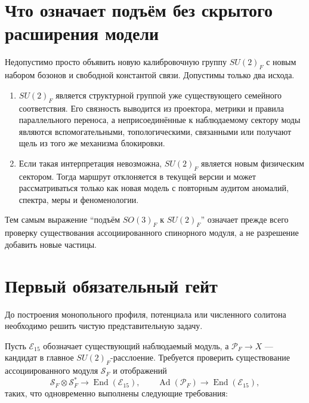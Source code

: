\section{Что означает подъём без скрытого расширения модели}

Недопустимо просто объявить новую калибровочную группу $SU(2)_F$ с новым
набором бозонов и свободной константой связи. Допустимы только два исхода.

\begin{enumerate}
 \item $SU(2)_F$ является структурной группой уже существующего семейного
 соответствия. Его связность выводится из проектора, метрики и правила
 параллельного переноса, а неприсоединённые к наблюдаемому сектору моды
 являются вспомогательными, топологическими, связанными или получают щель
 из того же механизма блокировки.
 \item Если такая интерпретация невозможна, $SU(2)_F$ является новым
 физическим сектором. Тогда маршрут отклоняется в текущей версии и может
 рассматриваться только как новая модель с повторным аудитом аномалий,
 спектра, меры и феноменологии.
\end{enumerate}

Тем самым выражение ``подъём $SO(3)_F$ к $SU(2)_F$'' означает прежде всего
проверку существования ассоциированного спинорного модуля, а не разрешение
добавить новые частицы.

\section{Первый обязательный гейт}

До построения монопольного профиля, потенциала или численного солитона
необходимо решить чистую представительную задачу.

Пусть $\mathcal E_{15}$ обозначает существующий наблюдаемый модуль, а
$\mathcal P_F\to X$ --- кандидат в главное $SU(2)_F$-расслоение. Требуется
проверить существование ассоциированного модуля $\mathcal S_F$ и
отображений
\begin{equation}
 \mathcal S_F\otimes\mathcal S_F^*\longrightarrow
 \operatorname{End}(\mathcal E_{15}),
 \qquad
 \operatorname{Ad}(\mathcal P_F)\longrightarrow
 \operatorname{End}(\mathcal E_{15}),
 \label{eq:v5-decision-representation-maps}
\end{equation}
таких, что одновременно выполнены следующие требования:

